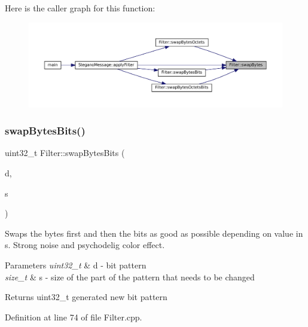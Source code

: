 Here is the caller graph for this function\+:
\nopagebreak
\begin{figure}[H]
\begin{center}
\leavevmode
\includegraphics[width=350pt]{classFilter_a9d4f7bd12f0bfdf200abf53d166fd944_icgraph}
\end{center}
\end{figure}
\mbox{\label{classFilter_a42c3e8f730c64a1bcdf187dc0a09082d}} 
\subsubsection{\texorpdfstring{swapBytesBits()}{swapBytesBits()}}
{\footnotesize\ttfamily uint32\+\_\+t Filter\+::swap\+Bytes\+Bits (\begin{DoxyParamCaption}\item[{uint32\+\_\+t}]{d,  }\item[{size\+\_\+t}]{s }\end{DoxyParamCaption})\hspace{0.3cm}{\ttfamily [static]}}



Swaps the bytes first and then the bits as good as possible depending on value in s. Strong noise and psychodelig color effect. 


\begin{DoxyParams}{Parameters}
{\em uint32\+\_\+t} & d -\/ bit pattern \\
\hline
{\em size\+\_\+t} & s -\/ size of the part of the pattern that needs to be changed \\
\hline
\end{DoxyParams}
\begin{DoxyReturn}{Returns}
uint32\+\_\+t generated new bit pattern 
\end{DoxyReturn}


Definition at line 74 of file Filter.\+cpp.

